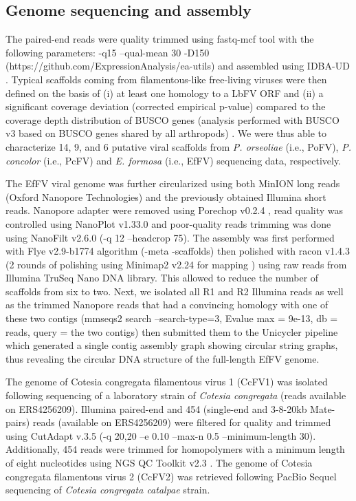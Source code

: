 \subsection{Genome sequencing and assembly}  

The paired-end reads were quality trimmed using fastq-mcf tool with the following parameters: -q15 --qual-mean 30 -D150 (https://github.com/ExpressionAnalysis/ea-utils) and assembled using IDBA-UD \citep{peng_idba-ud_2012}. Typical scaffolds coming from filamentous-like free-living viruses were then defined on the basis of (i) at least one homology to a LbFV ORF and (ii) a significant coverage deviation (corrected empirical p-value) compared to the coverage depth distribution of BUSCO genes (analysis performed with BUSCO v3 based on BUSCO genes shared by all arthropods) \citep{manni_busco_2021}. We were thus able to characterize 14, 9, and 6 putative viral scaffolds from \textit{P. orseoliae} (i.e., PoFV), \textit{P. concolor} (i.e., PcFV) and \textit{E. formosa} (i.e., EfFV) sequencing data, respectively.  

The EfFV viral genome was further circularized using both MinION long reads (Oxford Nanopore Technologies) and the previously obtained Illumina short reads. Nanopore adapter were removed using Porechop v0.2.4 \citep{wick_completing_2017}, read quality was controlled using NanoPlot v1.33.0 \citep{de_coster_nanopack_2018} and poor-quality reads trimming was done using NanoFilt v2.6.0 \citep{de_coster_nanopack_2018} (-q 12 --headcrop 75). The assembly was first performed with Flye v2.9-b1774 algorithm \citep{kolmogorov_metaflye_2020} (-meta -scaffolds) then polished with racon v1.4.3 \citep{vaser_fast_2017} (2 rounds of polishing using Minimap2 v2.24 for mapping \citep{li_minimap2_2018}) using raw reads from Illumina TruSeq Nano DNA library. This allowed to reduce the number of scaffolds from six to two. Next, we isolated all R1 and R2 Illumina reads as well as the trimmed Nanopore reads that had a convincing homology with one of these two contigs (mmseqs2 search --search-type=3, Evalue max = 9e-13, db = reads, query = the two contigs) then submitted them to the Unicycler pipeline \citep{wick_unicycler_2017} which generated a single contig assembly graph showing circular string graphs, thus revealing the circular DNA structure of the full-length EfFV genome. 

The genome of Cotesia congregata filamentous virus 1 (CcFV1) was isolated following sequencing of a laboratory strain of \textit{Cotesia congregata} (reads available on ERS4256209). Illumina paired-end and 454 (single-end and 3-8-20kb Mate-pairs) reads (available on ERS4256209) were filtered for quality and trimmed using CutAdapt v.3.5 \citep{martin_cutadapt_2011} (-q 20,20 –e 0.10 --max-n 0.5 --minimum-length 30). Additionally, 454 reads were trimmed for homopolymers with a minimum length of eight nucleotides using NGS QC Toolkit v2.3 \citep{patel_ngs_2012}. The genome of Cotesia congregata filamentous virus 2 (CcFV2) was retrieved following PacBio Sequel sequencing of \textit{Cotesia congregata catalpae} strain. 

